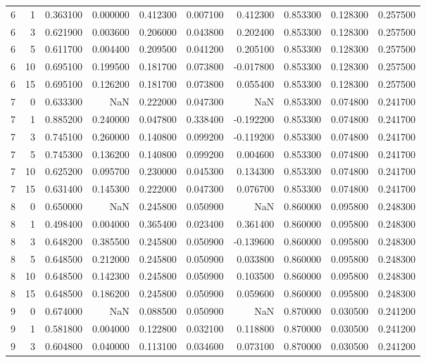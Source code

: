 \begin{table}
\begin{tabular}{rrrrrrrrrr}
6 & 1 & 0.363100 & 0.000000 & 0.412300 & 0.007100 & 0.412300 & 0.853300 & 0.128300 & 0.257500 \\
6 & 3 & 0.621900 & 0.003600 & 0.206000 & 0.043800 & 0.202400 & 0.853300 & 0.128300 & 0.257500 \\
6 & 5 & 0.611700 & 0.004400 & 0.209500 & 0.041200 & 0.205100 & 0.853300 & 0.128300 & 0.257500 \\
6 & 10 & 0.695100 & 0.199500 & 0.181700 & 0.073800 & -0.017800 & 0.853300 & 0.128300 & 0.257500 \\
6 & 15 & 0.695100 & 0.126200 & 0.181700 & 0.073800 & 0.055400 & 0.853300 & 0.128300 & 0.257500 \\
7 & 0 & 0.633300 & NaN & 0.222000 & 0.047300 & NaN & 0.853300 & 0.074800 & 0.241700 \\
7 & 1 & 0.885200 & 0.240000 & 0.047800 & 0.338400 & -0.192200 & 0.853300 & 0.074800 & 0.241700 \\
7 & 3 & 0.745100 & 0.260000 & 0.140800 & 0.099200 & -0.119200 & 0.853300 & 0.074800 & 0.241700 \\
7 & 5 & 0.745300 & 0.136200 & 0.140800 & 0.099200 & 0.004600 & 0.853300 & 0.074800 & 0.241700 \\
7 & 10 & 0.625200 & 0.095700 & 0.230000 & 0.045300 & 0.134300 & 0.853300 & 0.074800 & 0.241700 \\
7 & 15 & 0.631400 & 0.145300 & 0.222000 & 0.047300 & 0.076700 & 0.853300 & 0.074800 & 0.241700 \\
8 & 0 & 0.650000 & NaN & 0.245800 & 0.050900 & NaN & 0.860000 & 0.095800 & 0.248300 \\
8 & 1 & 0.498400 & 0.004000 & 0.365400 & 0.023400 & 0.361400 & 0.860000 & 0.095800 & 0.248300 \\
8 & 3 & 0.648200 & 0.385500 & 0.245800 & 0.050900 & -0.139600 & 0.860000 & 0.095800 & 0.248300 \\
8 & 5 & 0.648500 & 0.212000 & 0.245800 & 0.050900 & 0.033800 & 0.860000 & 0.095800 & 0.248300 \\
8 & 10 & 0.648500 & 0.142300 & 0.245800 & 0.050900 & 0.103500 & 0.860000 & 0.095800 & 0.248300 \\
8 & 15 & 0.648500 & 0.186200 & 0.245800 & 0.050900 & 0.059600 & 0.860000 & 0.095800 & 0.248300 \\
9 & 0 & 0.674000 & NaN & 0.088500 & 0.050900 & NaN & 0.870000 & 0.030500 & 0.241200 \\
9 & 1 & 0.581800 & 0.004000 & 0.122800 & 0.032100 & 0.118800 & 0.870000 & 0.030500 & 0.241200 \\
9 & 3 & 0.604800 & 0.040000 & 0.113100 & 0.034600 & 0.073100 & 0.870000 & 0.030500 & 0.241200 \\

\end{tabular}
\end{table}
